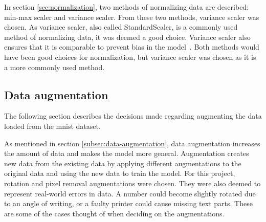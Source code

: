 In section \ref{sec:normalization}, two methods of normalizing data are described: min-max scaler and variance scaler. From these two methods, variance scaler was chosen. As variance scaler, also called StandardScaler, is a commonly used method of normalizing data, it was deemed a good choice. Variance scaler also ensures that it is comparable to prevent bias in the model~\cite{StandardScaler-towardsAi}. Both methods would have been good choices for normalization, but variance scaler was chosen as it is a more commonly used method.

\subsection{Data augmentation}
The following section describes the decisions made regarding augmenting the data loaded from the \gls{mnist} dataset.

As mentioned in section \ref{subsec:data-augmentation}, data augmentation increases the amount of data and makes the model more general. Augmentation creates new data from the existing data by applying different augmentations to the original data and using the new data to train the model. For this project, rotation and pixel removal augmentations were chosen. They were also deemed to represent real-world errors in data. A number could become slightly rotated due to an angle of writing, or a faulty printer could cause missing text parts. These are some of the cases thought of when deciding on the augmentations.



